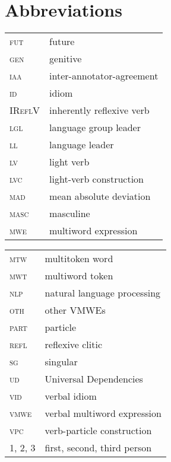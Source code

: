 \documentclass[output=paper,
modfonts,
]{langscibook}
\begin{document}
\section*{Abbreviations}
\label{sec:abbreviations}
%
\begin{tabularx}{.45\textwidth}{lp{4cm}}
\textsc{fut} & future \\
\textsc{gen} & genitive \\
\textsc{iaa} & inter-annotator-agreement \\
\textsc{id} & idiom \\
\textsc{IReflV} & inherently reflexive verb \\
\textsc{lgl} & language group leader \\
\textsc{ll} & language leader \\
\textsc{lv} & light verb \\
\textsc{lvc} & light-verb construction \\
\textsc{mad} & mean absolute deviation \\
\textsc{masc} & masculine \\
\textsc{mwe} & multiword expression \\
\end{tabularx}
\begin{tabularx}{.45\textwidth}{lp{4.5cm}}
\textsc{mtw} & multitoken word \\
\textsc{mwt} & multiword token \\
\textsc{nlp} & natural language processing \\
\textsc{oth} & other VMWEs \\
\textsc{part} & particle \\
\textsc{refl} & reflexive clitic \\
\textsc{sg} & singular \\
\textsc{ud} & Universal Dependencies \\
\textsc{vid} & verbal idiom \\
\textsc{vmwe} & verbal multiword expression \\
\textsc{vpc} & verb-particle construction \\
\textsc{1, 2, 3} & first, second, third person \\
\end{tabularx}




\printbibliography[heading=subbibliography,notkeyword=this]

%
\end{document}
